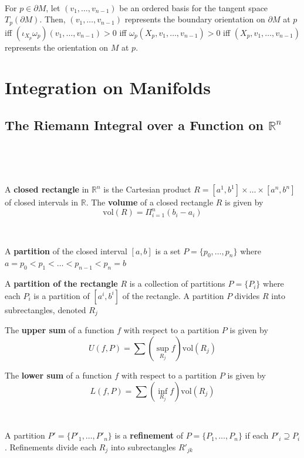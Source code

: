 \documentclass{article}
\begin{document}
\begin{customproof}
  \

  For $p \in \partial M$, let $(v_1,\dots, v_{n-1})$ be an ordered basis for the tangent space $T_p(\partial M)$. Then, $(v_1, \dots, v_{n-1})$ represents the boundary orientation on $\partial M$ at $p$ iff $(\iota_{X_p} \omega_p)(v_1, \dots, v_{n-1}) > 0$ iff $\omega_p(X_p, v_1, \dots, v_{n-1}) > 0$ iff $(X_p, v_1, \dots, v_{n-1})$ represents the orientation on $M$ at $p$.
\end{customproof}

\section{Integration on Manifolds}

\subsection{The Riemann Integral over a Function on $\mathbb{R}^n$}
\

\begin{definition}
  \

  A \textbf{closed rectangle} in $\mathbb{R}^n$ is the Cartesian product $R = [a^1, b^1] \times \dots \times [a^n, b^n]$ of closed intervals in $\mathbb{R}$. The \textbf{volume} of a closed rectangle $R$ is given by $$\text{vol}(R) = \Pi_{i=1}^n (b_i-a_i)$$
\end{definition}

\begin{definition}[Partitions]
  \

  A \textbf{partition} of the closed interval $[a,b]$ is a set $P = \{p_0, \dots, p_n\}$ where $ a= p_0 < p_1 < \dots < p_{n-1} < p_n = b$

  A \textbf{partition of the rectangle} $R$ is a collection of partitions $P = \{P_i\}$ where each $P_i$ is a partition of $[a^i, b^i]$ of the rectangle. A partition $P$ divides $R$ into subrectangles, denoted $R_j$

  The \textbf{upper sum} of a function $f$ with respect to a partition $P$ is given by $$U(f,P) = \sum (\sup_{R_j} f)\text{vol}(R_j)$$

  The \textbf{lower sum} of a function $f$ with respect to a partition $P$ is given by $$L(f,P) = \sum (\inf_{R_j} f)\text{vol}(R_j)$$
\end{definition}

\begin{definition}[Refinements]
  \

  A partition $P' = \{P'_1, \dots, P'_n\}$ is a \textbf{refinement} of $P = \{P_1, \dots, P_n\}$ if each $P'_i \supseteq P_i$. Refinements divide each $R_j$ into subrectangles $R'_{jk}$
\end{definition}
\end{document}
